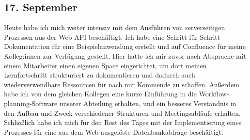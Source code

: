 \subsection*{17. September}
Heute habe ich mich weiter intensiv mit dem Ausführen von serverseitigen Prozessen aus der Web-API beschäftigt. Ich habe eine Schritt-für-Schritt Dokumentation für eine Beispielanwendung erstellt und auf Confluence für meine Kolleg:innen zur Verfügung gestellt. Hier hatte ich mir zuvor nach Absprache mit einem Mitarbeiter einen eigenen Space eingerichtet, um dort meinen Lernfortschritt strukturiert zu dokumentieren und dadurch auch wiederverwendbare Ressourcen für nach mir Kommende zu schaffen. 
Außerdem habe ich von dem gleichen Kollegen eine kurze Einführung in die Workflow-planning-Software unserer Abteilung erhalten, und ein besseres Verständnis in den Aufbau und Zweck verschiedener Strukturen und Meetingsabläufe erhalten. Schließlich habe ich mich für den Rest des Tages mit der Implementierung eines Prozesses für eine aus dem Web ausgelöste Datenbankabfrage beschäftigt.
